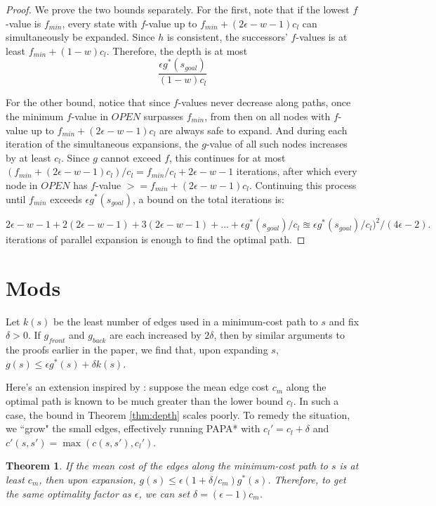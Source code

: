 \documentclass[letterpaper]{article}
\newtheorem{thm}{Theorem}
\begin{document}
\begin{proof}
We prove the two bounds separately. For the first, note that if the lowest $f$-value is $f_{min}$, every state with $f$-value up to $f_{min} + (2\epsilon-w-1)c_l$ can simultaneously be expanded. Since $h$ is consistent, the successors' $f$-values is at least $f_{min} + (1-w)c_l$. Therefore, the depth is at most
\[\frac{\epsilon g^*(s_{goal})}{(1-w)c_l}\]

For the other bound, notice that since $f$-values never decrease along paths, once the minimum $f$-value in $OPEN$ surpasses $f_{min}$, from then on all nodes with $f$-value up to $f_{min} + (2\epsilon-w-1)c_l$ are always safe to expand. And during each iteration of the simultaneous expansions, the $g$-value of all such nodes increases by at least $c_l$. Since $g$ cannot exceed $f$, this continues for at most $(f_{min} + (2\epsilon-w-1)c_l) / c_l = f_{min}/c_l + 2\epsilon-w-1$ iterations, after which every node in $OPEN$ has $f$-value $>= f_{min} + (2\epsilon-w-1)c_l$. Continuing this process until $f_{min}$ exceeds $\epsilon g^*(s_{goal})$, a bound on the total iterations is:

$2\epsilon-w-1 + 2(2\epsilon-w-1) + 3(2\epsilon-w-1) + ... + \epsilon g^*(s_{goal})/c_l
\approxeq \epsilon g^*(s_{goal})/c_l )^2 / ( 4\epsilon-2 ).$
iterations of parallel expansion is enough to find the optimal path.
\end{proof}

\section{Mods}

Let $k(s)$ be the least number of edges used in a minimum-cost path to $s$ and fix $\delta > 0$. If $g_{front}$ and $g_{back}$ are each increased by $2\delta$, then by similar arguments to the proofs earlier in the paper, we find that, upon expanding $s$, $g(s) \le \epsilon g^*(s) + \delta k(s)$.

Here's an extension inspired by \cite{klein1997randomized}: suppose the mean edge cost $c_m$ along the optimal path is known to be much greater than the lower bound $c_l$. In such a case, the bound in Theorem \ref{thm:depth} scales poorly. To remedy the situation, we ``grow" the small edges, effectively running PAPA* with $c_l' = c_l + \delta$ and $c'(s,s') = \max(c(s,s'), c_l')$.

\begin{thm}
\label{thm:delta}
If the mean cost of the edges along the minimum-cost path to $s$ is at least $c_m$, then upon expansion, $g(s) \le \epsilon(1+\delta/c_m)g^*(s)$. Therefore, to get the same optimality factor as $\epsilon$, we can set $\delta = (\epsilon-1)c_m$.
\end{thm}
\end{document}
